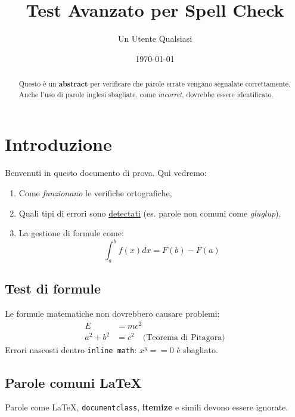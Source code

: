 \documentclass[11pt]{article}
\title{Test Avanzato per Spell Check}
\author{Un Utente Qualsiasi}
\date{\today}
\begin{document}
\maketitle

\begin{abstract}
Questo è un \textbf{abstract} per verificare che parole errate vengano segnalate correttamente. 
Anche l'uso di parole inglesi sbagliate, come \emph{incorret}, dovrebbe essere identificato.
\end{abstract}

\tableofcontents

\section{Introduzione}
Benvenuti in questo documento di prova. Qui vedremo:
\begin{enumerate}
    \item Come \textit{funzionano} le verifiche ortografiche,
    \item Quali tipi di errori sono \underline{detectati} (es. parole non comuni come \emph{gluglup}),
    \item La gestione di formule come:
    \[
        \int_{a}^{b} f(x) dx = F(b) - F(a)
    \]
\end{enumerate}

\subsection{Test di formule}
Le formule matematiche non dovrebbero causare problemi:
\begin{align}
    E &= mc^2 \\
    a^2 + b^2 &= c^2 \quad \text{(Teorema di Pitagora)}
\end{align}
Errori nascosti dentro \texttt{inline math}: $x^y == 0$ è sbagliato.

\subsection{Parole comuni LaTeX}
Parole come \LaTeX, \texttt{documentclass}, \textbf{itemize} e simili devono essere ignorate.
\end{document}
